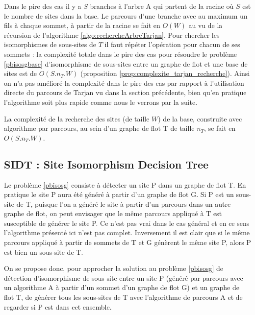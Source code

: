 Dans le pire des cas il y a $S$ branches à l'arbre A qui partent de la racine où $S$ est le nombre de sites dans la base. Le parcours d'une branche avec au maximum un fils à chaque sommet, à partir de la racine se fait en $O(W)$ au vu de la récursion de l'algorithme \ref{algo:rechercheArbreTarjan}. Pour chercher les isomorphismes de sous-sites de $T$ il faut répéter l'opération pour chacun de ses sommets : la complexité totale dans le pire des cas pour résoudre le problème \ref{pbisosgbase} d'isomorphisme de sous-sites entre un graphe de flot et une base de sites est de $O(S.n_T.W)$ (proposition \ref{prop:complexite_tarjan_recherche}). Ainsi on n'a pas amélioré la complexité dans le pire des cas par rapport à l'utilisation directe du parcours de Tarjan vu dans la section précédente, bien qu'en pratique l'algorithme soit plus rapide comme nous le verrons par la suite.

\begin{prop}
 La complexité de la recherche des sites (de taille $W$) de la base, construite avec algorithme par parcours, au sein d'un graphe de flot T de taille $n_T$, se fait en $O(S.n_T.W)$.
\label{prop:complexite_tarjan_recherche}
\end{prop}


\FloatBarrier
\subsection{SIDT : Site Isomorphism Decision Tree}
Le problème \ref{pbisosg} consiste à détecter un site P dans un graphe de flot T. En pratique le site P aura été généré à partir d'un graphe de flot G. Si P est un sous-site de T, puisque l'on a généré le site à partir d'un parcours dans un autre graphe de flot, on peut envisager que le même parcours appliqué à T est susceptible de générer le site P. Ce n'est pas vrai dans le cas général et en ce sens l'algorithme présenté ici n'est pas complet.
Inversement il est clair que si le même parcours appliqué à partir de sommets de T et G génèrent le même site P, alors P est bien un sous-site de T.

On se propose donc, pour approcher la solution au problème \ref{pbisosg} de détection d'isomorphisme de sous-site entre un site P (généré par parcours avec un algorithme A à partir d'un sommet d'un graphe de flot G) et un graphe de flot T, de générer tous les sous-sites de T avec l'algorithme de parcours A et de regarder si P est dans cet ensemble.

